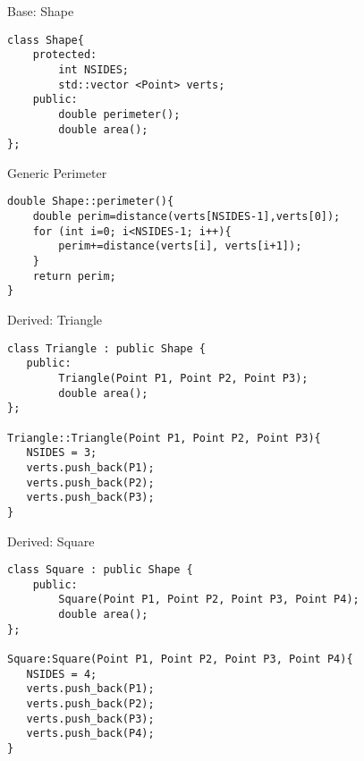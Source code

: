 \documentclass[xcolor={dvipsnames}]{beamer}
\begin{document}
\begin{frame}[fragile]{Base: Shape}
\begin{verbatim}
class Shape{
    protected:
        int NSIDES;
        std::vector <Point> verts;
    public:
        double perimeter();
        double area();
};
\end{verbatim}
\end{frame}

\begin{frame}[fragile]{Generic Perimeter}
\begin{verbatim}
double Shape::perimeter(){
    double perim=distance(verts[NSIDES-1],verts[0]);
    for (int i=0; i<NSIDES-1; i++){
        perim+=distance(verts[i], verts[i+1]);
    }
    return perim;
}
\end{verbatim}
\end{frame}

\begin{frame}[fragile]{Derived: Triangle}
\begin{verbatim}
class Triangle : public Shape {
   public:
        Triangle(Point P1, Point P2, Point P3);
        double area();
};

Triangle::Triangle(Point P1, Point P2, Point P3){
   NSIDES = 3;
   verts.push_back(P1);
   verts.push_back(P2);
   verts.push_back(P3);   
}
\end{verbatim}
\end{frame}

\begin{frame}[fragile]{Derived: Square}
\begin{verbatim}
class Square : public Shape {
    public:
        Square(Point P1, Point P2, Point P3, Point P4);
        double area();
};

Square:Square(Point P1, Point P2, Point P3, Point P4){
   NSIDES = 4;
   verts.push_back(P1);
   verts.push_back(P2);
   verts.push_back(P3);   
   verts.push_back(P4);
}
\end{verbatim}
\end{frame}
\end{document}
